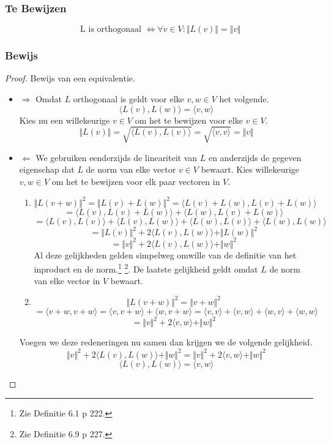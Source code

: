 \documentclass[lineaire_algebra_oplossingen.tex]{subfiles}
\begin{document}
\subsubsection*{Te Bewijzen}
\[
\text{ L is orthogonaal } \Leftrightarrow \forall v \in V: \Vert L(v) \Vert = \Vert v\Vert
\]
\subsubsection*{Bewijs}
\begin{proof}
Bewijs van een equivalentie.\\
\begin{itemize}
\item $\Rightarrow$
Omdat $L$ orthogonaal is geldt voor elke $v,w \in V$ het volgende.
\[
\langle L(v), L(w) \rangle = \langle v,w\rangle
\]
Kies nu een willekeurige $v \in V$ om het te bewijzen voor elke $v\in V$.
\[
\Vert L(v) \Vert = \sqrt{\langle L(v), L(v) \rangle} = \sqrt{\langle v, v \rangle} = \Vert v\Vert
\]

\item $\Leftarrow$
We gebruiken eenderzijds de lineariteit van $L$ en anderzijds de gegeven eigenschap dat $L$ de norm van elke vector $v \in V$ bewaart. Kies willekeurige $v,w \in V$ om het te bewijzen voor elk paar vectoren in $V$.
\begin{enumerate}
\item
\[
\Vert L(v+w) \Vert^2 = \Vert L(v)+L(w) \Vert^2 = \langle L(v)+L(w),L(v)+L(w) \rangle
\]
\[
= \langle L(v),L(v)+L(w) \rangle + \langle L(w),L(v)+L(w) \rangle
\]
\[
= \langle L(v),L(v) \rangle + \langle L(v),L(w) \rangle + \langle L(w),L(v) \rangle +\langle L(w),L(w) \rangle
\]
\[
= \Vert L(v)\Vert^2 + 2\langle L(v),L(w) \rangle +\Vert L(w)\Vert^2
\]
\[
= \Vert v\Vert^2 + 2\langle L(v),L(w) \rangle +\Vert w\Vert^2
\]
Al deze gelijkheden gelden simpelweg omwille van de definitie van het inproduct en de norm.\footnote{Zie Definitie 6.1 p 222.} \footnote{Zie Definitie 6.9 p 227.}. De laatste gelijkheid geldt omdat $L$ de norm van elke vector in $V$ bewaart.
\item
\[
\Vert L(v+w) \Vert^2 = \Vert v+w \Vert^2
\]
\[
= \langle v+w,v+w\rangle = \langle v,v+w\rangle + \langle w,v+w\rangle = \langle v,v\rangle + \langle v,w\rangle + \langle w,v\rangle + \langle w,w\rangle
\]
\[
= \Vert v\Vert^2 + 2\langle v,w \rangle +\Vert w\Vert^2
\]
\end{enumerate}
Voegen we deze redeneringen nu samen dan krijgen we de volgende gelijkheid.
\[
\Vert v\Vert^2 + 2\langle L(v),L(w) \rangle +\Vert w\Vert^2 = \Vert v\Vert^2 + 2\langle v,w \rangle +\Vert w\Vert^2
\]
\[
\langle L(v),L(w) \rangle =\langle v,w \rangle
\]
\end{itemize}
\end{proof}
\end{document}
